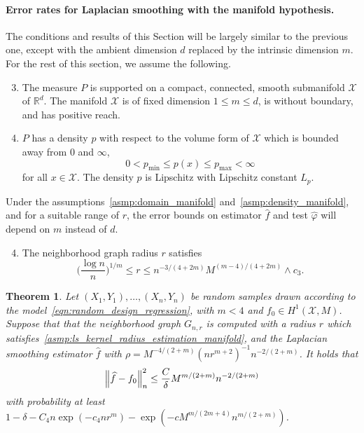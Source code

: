 \documentclass[twoside]{article}
\newcommand{\Reals}{\mathbb{R}}
\newcommand{\1}{\mathbf{1}}
\newcommand{\Xset}{\mathcal{X}}
\newcommand{\wh}[1]{\widehat{#1}}
\newtheorem{theorem}{Theorem}
\theoremstyle{definition}
\theoremstyle{remark}
\begin{document}
\paragraph{Error rates for Laplacian smoothing with the manifold hypothesis.}
The conditions and results of this Section will be largely similar to the previous one, except with the ambient dimension $d$ replaced by the intrinsic dimension $m$. For the rest of this section, we assume the following.
\begin{enumerate}[label=(P\arabic*)]
	\setcounter{enumi}{2}
	\item 
	\label{asmp:domain_manifold}
	The measure $P$ is supported on a compact, connected, smooth submanifold $\Xset$ of $\Reals^d$. The manifold $\Xset$ is of fixed dimension $1 \leq m \leq d$, is without boundary, and has positive reach. 
	\item 
	\label{asmp:density_manifold} $P$ has a density $p$ with respect to the volume form of $\Xset$ which is bounded away from $0$ and $\infty$,
	\begin{equation*}
	0 < p_{\min} \leq p(x) \leq p_{\max} < \infty
	\end{equation*}
	for all $x \in \Xset$. The density $p$ is Lipschitz with Lipschitz constant $L_p$.
\end{enumerate}
Under the assumptions~\ref{asmp:domain_manifold} and~\ref{asmp:density_manifold}, and for a suitable range of $r$, the error bounds on estimator $\wh{f}$ and test $\wh{\varphi}$ will depend on $m$ instead of $d$. 

\begin{enumerate}[label=(R\arabic*)]
	\setcounter{enumi}{3}
	\item 
	\label{asmp:ls_kernel_radius_estimation_manifold}
	The neighborhood graph radius $r$ satisfies
	\begin{equation*}
	\biggl(\frac{\log n}{n}\biggr)^{1/m} \leq r \leq n^{-3/(4 + 2m)} M^{(m - 4)/(4 + 2m)} \wedge c_3.
	\end{equation*}
\end{enumerate}
\begin{theorem}
	\label{thm:laplacian_smoothing_estimation_manifold}
	Let $(X_1,Y_1),\ldots,(X_n,Y_n)$ be random samples drawn according to the model~\eqref{eqn:random_design_regression}, with $m < 4$ and $f_0 \in H^1(\Xset,M)$. Suppose that that the neighborhood graph $G_{n,r}$ is computed with a radius $r$ which satisfies~\ref{asmp:ls_kernel_radius_estimation_manifold},  and the Laplacian smoothing estimator $\wh{f}$ with $\rho = M^{-4/(2 + m)} (nr^{m + 2})^{-1} n^{-2/(2 + m)}$. It holds that
	\begin{equation*}
	\Bigl\|\wh{f} - f_0\Bigr\|_n^2 \leq \frac{C}{\delta} M^{m/(2 + m)} n^{-2/(2 + m)}
	\end{equation*}
	with probability at least $1 - \delta -  C_4n\exp(-c_4nr^m) - \exp(-c M^{m/(2m + 4)} n^{m/(2+m)})$.
\end{theorem}
\end{document}

